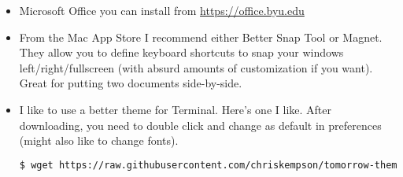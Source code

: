 \begin{itemize}
\item Microsoft Office you can install from \url{https://office.byu.edu}


\item From the Mac App Store I recommend either Better Snap Tool or Magnet.  They allow you to define keyboard shortcuts to snap your windows left/right/fullscreen (with absurd amounts of customization if you want).  Great for putting two documents side-by-side.  

\item I like to use a better theme for Terminal.  Here's one I like.  After downloading, you need to double click and change as default in preferences (might also like to change fonts).
\begin{lstlisting}[language=bash]
$ wget https://raw.githubusercontent.com/chriskempson/tomorrow-theme/master/OS%20X%20Terminal/Tomorrow%20Night.terminal
\end{lstlisting}

\end{itemize}


